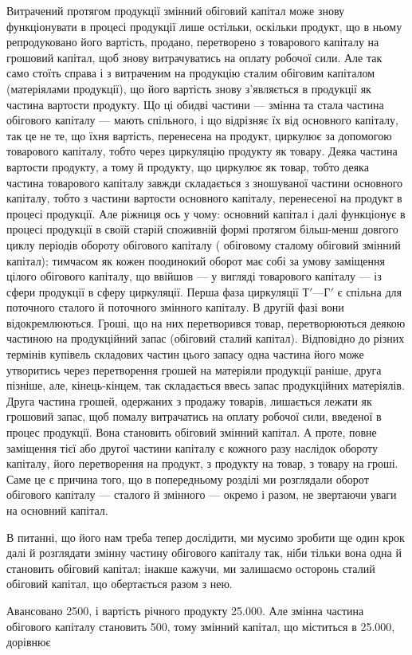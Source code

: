 Витрачений протягом продукції змінний обіговий капітал може знову
функціонувати в процесі продукції лише остільки, оскільки продукт, що
в ньому репродуковано його вартість, продано, перетворено з товарового
капіталу на грошовий капітал, щоб знову витрачуватись на оплату робочої
сили. Але так само стоїть справа і з витраченим на продукцію сталим
обіговим капіталом (матеріялами продукції), що його вартість знову з’являється
в продукції як частина вартости продукту. Що ці обидві частини —
змінна та стала частина обігового капіталу — мають спільного, і що відрізняє
їх від основного капіталу, так це не те, що їхня вартість, перенесена
на продукт, циркулює за допомогою товарового капіталу, тобто
через циркуляцію продукту як товару. Деяка частина вартости продукту,
а тому й продукту, що циркулює як товар, тобто деяка частина товарового
капіталу завжди складається з зношуваної частини основного капіталу,
тобто з частини вартости основного капіталу, перенесеної на продукт
в процесі продукції. Але ріжниця ось у чому: основний капітал і
далі функціонує в процесі продукції в своїй старій споживній формі протягом
більш-менш довгого циклу періодів обороту обігового капіталу
(\deq{} обіговому сталому \dplus{} обіговий змінний капітал); тимчасом як кожен
поодинокий оборот має собі за умову заміщення цілого обігового капіталу,
що ввійшов — у вигляді товарового капіталу — із сфери продукції в
сферу циркуляції. Перша фаза циркуляції $Т' — Г'$ є спільна для поточного
сталого й поточного змінного капіталу. В другій фазі вони відокремлюються.
Гроші, що на них перетворився товар, перетворюються деякою
частиною на продукційний запас (обіговий сталий капітал). Відповідно до
різних термінів купівель складових частин цього запасу одна частина
його може утворитись через перетворення грошей на матеріяли продукції
раніше, друга пізніше, але, кінець-кінцем, так складається ввесь запас продукційних
матеріялів. Друга частина грошей, одержаних з продажу товарів,
лишається лежати як грошовий запас, щоб помалу витрачатись на
оплату робочої сили, введеної в процес продукції. Вона становить обіговий
змінний капітал. А проте, повне заміщення тієї або другої частини капіталу
є кожного разу наслідок обороту капіталу, його перетворення на продукт,
з продукту на товар, з товару на гроші. Саме це є причина того,
що в попередньому розділі ми розглядали оборот обігового капіталу — сталого
й змінного — окремо і разом, не звертаючи уваги на основний капітал.

В питанні, що його нам треба тепер дослідити, ми мусимо зробити ще
один крок далі й розглядати змінну частину обігового капіталу так, ніби
тільки вона одна й становить обіговий капітал; інакше кажучи, ми залишаємо
осторонь сталий обіговий капітал, що обертається разом з нею.

Авансовано 2500, і вартість річного продукту \deq{} \num{25.000}. Але змінна частина обігового капіталу становить 500,
тому змінний капітал, що міститься в \num{25.000}, дорівнює
\parbreak{}  %
